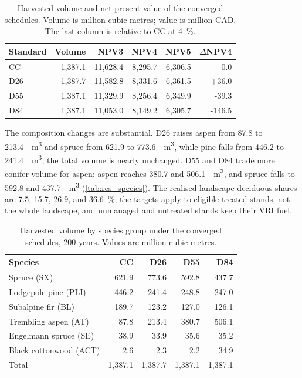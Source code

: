 \begin{table}[h]
    \centering
    \small
    \caption{Harvested volume and net present value of the converged schedules. Volume is million
    cubic metres; value is million CAD. The last column is relative to CC at \SI{4}{\percent}.}
    \label{tab:res_economics}
    \begin{tabular}{lrrrrr}
        \toprule
        Standard & Volume & NPV3 & NPV4 & NPV5 & $\Delta$NPV4 \\
        \midrule
        CC  & 1,387.1 & 11,628.4 & 8,295.7 & 6,306.5 & 0.0 \\
        D26 & 1,387.7 & 11,582.8 & 8,331.6 & 6,361.5 & +36.0 \\
        D55 & 1,387.1 & 11,329.9 & 8,256.4 & 6,349.9 & -39.3 \\
        D84 & 1,387.1 & 11,053.0 & 8,149.2 & 6,305.7 & -146.5 \\
        \bottomrule
    \end{tabular}
\end{table}

The composition changes are substantial. D26 raises aspen from 87.8 to \SI{213.4}{\mega\cubic\meter} and
spruce from 621.9 to \SI{773.6}{\mega\cubic\meter}, while pine falls from 446.2 to
\SI{241.4}{\mega\cubic\meter}; the total volume is nearly unchanged. D55 and D84 trade more conifer
volume for aspen: aspen reaches 380.7 and \SI{506.1}{\mega\cubic\meter}, and spruce falls to 592.8
and \SI{437.7}{\mega\cubic\meter} (\autoref{tab:res_species}). The realised landscape deciduous
shares are 7.5, 15.7, 26.9, and \SI{36.6}{\percent}; the targets apply to eligible treated stands,
not the whole landscape, and unmanaged and untreated stands keep their VRI fuel.

\begin{table}[h]
    \centering
    \small
    \caption{Harvested volume by species group under the converged schedules, 200 years. Values are
    million cubic metres.}
    \label{tab:res_species}
    \begin{tabular}{lrrrr}
        \toprule
        Species & CC & D26 & D55 & D84 \\
        \midrule
        Spruce (SX)       & 621.9 & 773.6 & 592.8 & 437.7 \\
        Lodgepole pine (PLI) & 446.2 & 241.4 & 248.8 & 247.0 \\
        Subalpine fir (BL) & 189.7 & 123.2 & 127.0 & 126.1 \\
        Trembling aspen (AT) & 87.8  & 213.4 & 380.7 & 506.1 \\
        Engelmann spruce (SE) & 38.9  & 33.9  & 35.6  & 35.2 \\
        Black cottonwood (ACT) & 2.6   & 2.3   & 2.2   & 34.9 \\
        \midrule
        Total             & 1,387.1 & 1,387.7 & 1,387.1 & 1,387.1 \\
        \bottomrule
    \end{tabular}
\end{table}

